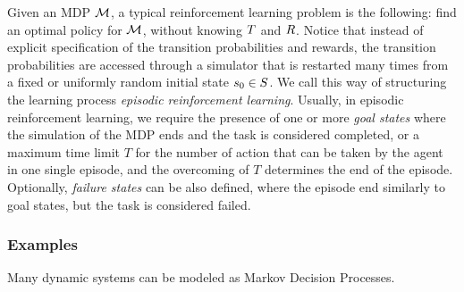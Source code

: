 Given an MDP $\mathcal{M}$, a typical reinforcement learning problem is the following: find an optimal policy for $\mathcal{M}$, without knowing $T$ and $R$. Notice that instead of explicit specification of the transition probabilities and rewards, the transition probabilities are accessed through a simulator that is restarted many times from a fixed or uniformly random initial state $s_0\in S$. We call this way of structuring the learning process \emph{episodic reinforcement learning}. Usually, in episodic reinforcement learning, we require the presence of one or more \emph{goal states} where the simulation of the MDP ends and the task is considered completed, or a maximum time limit $T$ for the number of action that can be taken by the agent in one single episode, and the overcoming of $T$ determines the end of the episode. Optionally, \emph{failure states} can be also defined, where the episode end similarly to goal states, but the task is considered failed.

\subsubsection{Examples}
Many dynamic systems can be modeled as Markov Decision Processes. 

